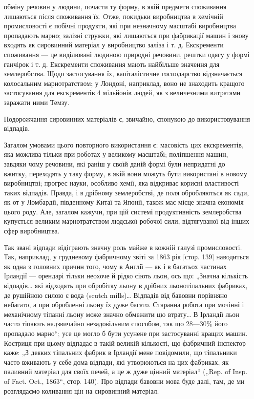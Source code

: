 \parcont{}  %
обміну речовин у людини, почасти ту форму, в якій предмети
споживання лишаються після споживання їх. Отже, покидьки
виробництва в хемічній промисловості є побічні продукти, які
при незначному масштабі виробництва пропадають марно; залізні
стружки, які лишаються при фабрикації машин і знову входять
як сировинний матеріал у виробництво заліза і т. д. Екскременти споживання — це виділювані людиною
природні речовини,
рештки одягу у формі ганчірок і т. д. Екскременти споживання
мають найбільше значення для землеробства. Щодо застосування
їх, капіталістичне господарство відзначається колосальним марнотратством; у Лондоні, наприклад, воно
не знаходить кращого
застосування для екскрементів 4 мільйонів людей, як з величезними витратами заражати ними Темзу.

Подорожчання сировинних матеріалів є, звичайно, спонукою
до використовування відпадів.

Загалом умовами цього повторного використання є: масовість
цих екскрементів, яка можлива тільки при роботах у великому
масштабі; поліпшення машин, завдяки чому речовини, які раніш
у своїй даній формі були непридатні до вжитку, переходять
у таку форму, в якій вони можуть бути використані в новому
виробництві; прогрес науки, особливо хемії, яка відкриває корисні властивості таких відпадів.
Правда, і в дрібному землеробстві, де поля обробляються як сади, як от у Ломбардії, південному Китаї
та Японії, також має місце значна економія
цього роду. Але, загалом кажучи, при цій системі продуктивність землеробства купується великим
марнотратством людської робочої сили, відтягуваної від інших сфер виробництва.

Так звані відпади відіграють значну роль майже в кожній
галузі промисловості. Так, наприклад, у грудневому фабричному звіті за 1863 рік [стор. 139]
наводиться як одна з головних
причин того, чому в Англії — як і в багатьох частинах Ірландії —
орендарі тільки неохоче й рідко сіють льон, ось що: „Значна
кількість відпадів\dots{} які відходять при обробітку льону в дрібних льонотіпальних фабриках, де
рушійною силою є вода
(scutch mills)\dots{} Відпадів від бавовни порівняно небагато, а при
обробленні льону їх дуже багато. Старанна робота при мочінні і механічному тіпанні льону може значно
обмежити цю
втрату\dots{} В Ірландії льон часто тіпають надзвичайно незадовільним способом, так що 28—30\% його
пропадало марно“; усе це
могло б бути усунене при застосуванні кращих машин. Костриця при цьому відпадає в такій великій
кількості, що фабричний інспектор каже: „З деяких тіпальних фабрик в Ірландії
мене повідомили, що тіпальники часто вживають у себе дома
відпади, які утворюються на цих фабриках, як паливний матеріал для своїх печей, а це ж дуже цінний
матеріал“ („Rep. of
Insp. of Fact. Oct., 1863“, стор. 140). Про відпади бавовни мова
буде далі, там, де ми розглядаємо коливання цін на сировинний
матеріал.

